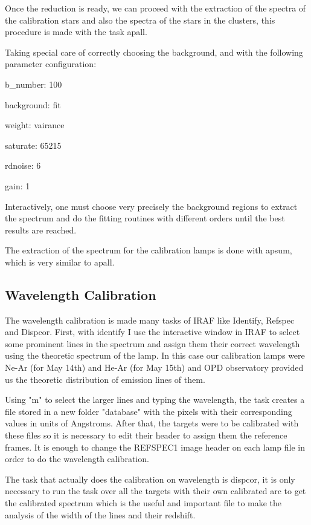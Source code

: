 Once the reduction is ready, we can proceed with the extraction of the spectra of the calibration stars and also the spectra of the stars in the clusters, this procedure is made with the task apall.

Taking special care of correctly choosing the background, and with the following parameter configuration:

b\_number: 100

background: fit

weight: vairance

saturate: 65215

rdnoise: 6

gain: 1

Interactively, one must choose very precisely the background regions to extract the spectrum and do the fitting routines with different orders until the best results are reached.

The extraction of the spectrum for the calibration lamps is done with apsum, which is very similar to apall.

\subsection{Wavelength Calibration}

The wavelength calibration is made many tasks of IRAF like Identify, Refspec and Dispcor. First, with identify I use the interactive window in IRAF to select some prominent lines in the spectrum and assign them their correct wavelength using the theoretic spectrum of the lamp. In this case our calibration lamps were Ne-Ar (for May 14th) and He-Ar (for May 15th)  and OPD observatory provided us the theoretic distribution of emission lines of them.

Using "m" to select the larger lines and typing the wavelength, the task creates a file stored in a new folder "database" with the pixels with their corresponding values in units of Angstroms. After that, the targets were to be calibrated with these files so it is necessary to edit their header to assign them the reference frames. It is enough to change the REFSPEC1 image header on each lamp file in order to do the wavelength calibration. 

The task that actually does the calibration on wavelength is dispcor, it is only necessary to run the task over all the targets with their own calibrated arc to get the calibrated spectrum which is the useful and important file to make the analysis of the width of the lines and their redshift.

